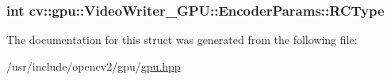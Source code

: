 \hypertarget{structcv_1_1gpu_1_1VideoWriter__GPU_1_1EncoderParams_acf99e6f1c0a59c82c0dfdb7e7d09240f}{
\subsubsection[{R\-C\-Type}]{\setlength{\rightskip}{0pt plus 5cm}int cv\-::gpu\-::\-Video\-Writer\-\_\-\-G\-P\-U\-::\-Encoder\-Params\-::\-R\-C\-Type}}\label{structcv_1_1gpu_1_1VideoWriter__GPU_1_1EncoderParams_acf99e6f1c0a59c82c0dfdb7e7d09240f}


The documentation for this struct was generated from the following file\-:\begin{DoxyCompactItemize}
\item 
/usr/include/opencv2/gpu/\hyperlink{gpu_2gpu_8hpp}{gpu.\-hpp}\end{DoxyCompactItemize}
